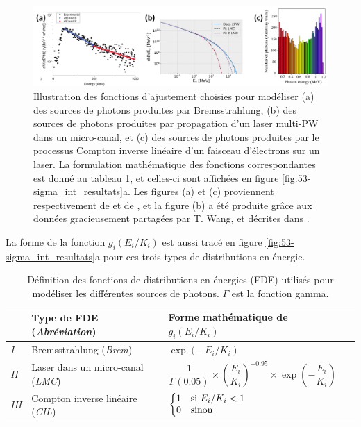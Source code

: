\begin{refsection}
\begin{figure}[hb]
	\centering
	\includegraphics[width=\linewidth]{5-opti_theorique/gamma_energy_distribution.png}
	\caption{Illustration des fonctions d'ajustement choisies pour modéliser (a) des sources de photons produites par Bremsstrahlung, (b) des sources de photons produites par propagation d'un laser multi-PW dans un micro-canal, et (c) des sources de photons produites par le processus Compton inverse linéaire d'un faisceau d'électrons sur un laser. La formulation mathématique des fonctions correspondantes est donné au tableau \ref{tab:53-g_definitions}, et celles-ci sont affichées en figure \ref{fig:53-sigma_int_resultats}a. Les figures (a) et (c) proviennent respectivement de \parencite{zulick_2013} et de \parencite{drebot_2017a}, et la figure (b) a été produite grâce aux données gracieusement partagées par T. Wang, et décrites dans \parencite{wang_2020}.} 
	\label{fig:53-exemples_f}
\end{figure}

La forme de la fonction $g_i(E_i/K_i)$ est aussi tracé en figure \ref{fig:53-sigma_int_resultats}a pour ces trois types de distributions en énergie.

\begin{table}[t]
    \centering
    \begin{tabular}{ | l | l | l | l |}
    \hline
                & Type de FDE (\textit{Abréviation})       & Forme mathématique de $g_i(E_i/K_i)$ \\
    \hline
    \textit{I}   & Bremsstrahlung (\textit{Brem})           & $\exp(-E_i/K_i)$ \\
    \textit{II}  & Laser dans un micro-canal (\textit{LMC}) & $\dfrac{1}{\Gamma(0.05)} \times \left(\dfrac{E_i}{K_i}\right)^{-0.95} \times \exp\left(-\dfrac{E_i}{K_i}\right)$ \\
    \textit{III} & Compton inverse linéaire (\textit{CIL})  & $\left\{\begin{array}{@{}ll@{}} 1 & \text{si}\ E_i/K_i < 1 \\0 & \text{sinon}\end{array}\right.$ \\
    \hline
	\end{tabular}
    \caption{Définition des fonctions de distributions en énergies (FDE) utilisés pour modéliser les différentes sources de photons. $\Gamma$ est la fonction gamma.}
	\label{tab:53-g_definitions}
\end{table}


\end{refsection}
